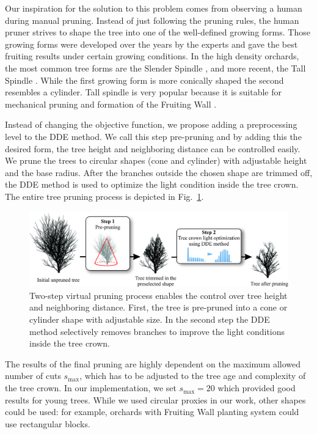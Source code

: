 Our inspiration for the solution to this problem comes from observing a
human during manual pruning. Instead of just following the pruning
rules, the human pruner strives to shape the tree into one of the
well-defined growing forms. Those growing forms were developed over the
years by the experts and gave the best fruiting results under certain
growing conditions. In the high density orchards, the most common tree
forms are the Slender Spindle \cite{weber_optimizing_2000}, and more recent, the Tall
Spindle \cite{robinson_vision_2013}. While the first growing form is more conically shaped
the second resembles a cylinder. Tall spindle is very popular because it
is suitable for mechanical pruning and formation of the Fruiting Wall
\cite{robinson_vision_2013}.

Instead of changing the objective function, we propose adding a
preprocessing level to the DDE method. We call this step pre-pruning and
by adding this the desired form, the tree height and neighboring
distance can be controlled easily. We prune the trees to circular shapes
(cone and cylinder) with adjustable height and the base radius. After
the branches outside the chosen shape are trimmed off, the DDE method is
used to optimize the light condition inside the tree crown. The entire
tree pruning process is depicted in Fig.~\ref{fig:my_figure3}.
\begin{figure}[hbt]
    \centering
    \includegraphics[width=5.3in]{figs/image3.jpeg}
    \caption{Two-step virtual pruning process enables the control
over tree height and neighboring distance. First, the tree is pre-pruned
into a cone or cylinder shape with adjustable size. In the second step
the DDE method selectively removes branches to improve the light
conditions inside the tree crown.}
    \label{fig:my_figure3}
\end{figure}

The results of the final pruning are highly dependent on the maximum
allowed number of cuts \(s_{\mathrm{\max}}\), which has to be adjusted
to the tree age and complexity of the tree crown. In our implementation,
we set \(s_{\mathrm{\max}} = 20\) which provided good results for young
trees. While we used circular proxies in our work, other shapes could be
used: for example, orchards with Fruiting Wall planting system could use
rectangular blocks.
